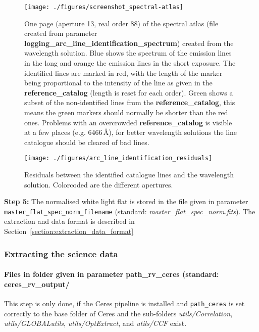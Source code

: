 \documentclass[10pt,a4paper]{article}
\begin{document}
\begin{figure} 
  \begin{center}
    \texttt{[image: ./figures/screenshot\_spectral-atlas]}
  \end{center} 
  \caption{One page (aperture 13, real order 88) of the spectral atlas (file created from parameter \textbf{logging\_arc\_line\_identification\_spectrum}) created from the wavelength solution. Blue shows the spectrum of the emission lines in the long and orange the emission lines in the short exposure. The identified lines are marked in red, with the length of the marker being proportional to the intensity of the line as given in the \textbf{reference\_catalog} (length is reset for each order). Green shows a subset of the non-identified lines from the \textbf{reference\_catalog}, this means the green markers should normally be shorter than the red ones. Problems with an overcrowded \textbf{reference\_catalog} is visible at a few places (e.g. 6466\,\AA), for better wavelength solutions the line catalogue should be cleared of bad lines.
    \label{figure_arc_line_identification_spectrum}}
\end{figure}


\begin{figure} 
  \begin{center}
    \texttt{[image: ./figures/arc\_line\_identification\_residuals]}
  \end{center} 
  \caption{Residuals between the identified catalogue lines and the wavelength solution. Colorcoded are the different apertures.
    \label{figure_arc_line_identification_residuals}}
\end{figure}

\vspace{0.5em}\noindent \textbf{Step 5:} The normalised white light flat is stored in the file given in parameter \verb|master_flat_spec_norm_filename| (standard: \textit{master\_flat\_spec\_norm.fits}). The extraction and data format is described in Section~\ref{section:extraction_data_format}

\subsubsection{Extracting the science data}
\paragraph{Files in folder given in parameter path\_rv\_ceres (standard: ceres\_rv\_output/}
This step is only done, if the Ceres pipeline is installed and \verb|path_ceres| is set correctly to the base folder of Ceres and the sub-folders \textit{utils/Correlation}, \textit{utils/GLOBALutils}, \textit{utils/OptExtract}, and \textit{utils/CCF} exist.
\end{document}
